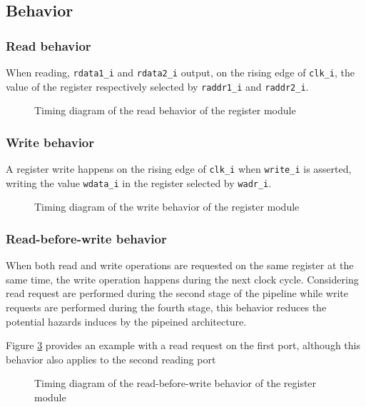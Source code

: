   \subsection{Behavior}

    \subsubsection{Read behavior}

      \begin{content}
          When reading, \texttt{rdata1\_i} and \texttt{rdata2\_i} output, on the rising edge of \texttt{clk\_i}, the value of the register respectively selected by \texttt{raddr1\_i} and \texttt{raddr2\_i}.
        \end{content}

      \begin{figure}[H]
          \centering
          
          \caption{Timing diagram of the read behavior of the register module}
          \label{fig:regm-behavior-read}
        \end{figure}

    \subsubsection{Write behavior}

      \begin{content}
          A register write happens on the rising edge of \texttt{clk\_i} when \texttt{write\_i} is asserted, writing the value \texttt{wdata\_i} in the register selected by \texttt{wadr\_i}.
        \end{content}

      \begin{figure}[H]
          \centering
          
          \caption{Timing diagram of the write behavior of the register module}
          \label{fig:regm-behavior-write}
        \end{figure}

    \subsubsection{Read-before-write behavior}

      \begin{content}
          When both read and write operations are requested on the same register at the same time, the write operation happens during the next clock cycle. Considering read request are performed during the second stage of the pipeline while write requests are performed during the fourth stage, this behavior reduces the potential hazards induces by the pipeined architecture.

          Figure \ref{fig:regm-behavior-read-before-write} provides an example with a read request on the first port, although this behavior also applies to the second reading port
        \end{content}

      \begin{figure}[H]
          \centering
          
          \caption{Timing diagram of the read-before-write behavior of the register module}
          \label{fig:regm-behavior-read-before-write}
        \end{figure}

\newpage
